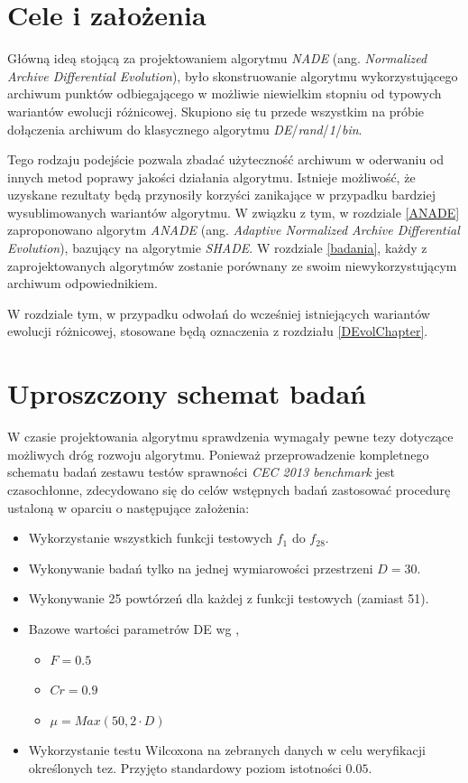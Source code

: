 \documentclass[12pt,a4paper]{report}
\begin{document}
{{{{{{\section{Cele i założenia}
\par{
Główną ideą stojącą za projektowaniem algorytmu \emph{NADE} (ang. \emph{Normalized Archive Differential Evolution}), było skonstruowanie algorytmu wykorzystującego archiwum punktów odbiegającego w możliwie niewielkim stopniu od typowych wariantów ewolucji różnicowej. Skupiono się tu przede wszystkim na próbie dołączenia archiwum do klasycznego algorytmu \emph{DE}/\emph{rand}/\emph{1}/\emph{bin}.
}
\par{
Tego rodzaju podejście pozwala zbadać użyteczność archiwum w oderwaniu od innych metod poprawy jakości działania algorytmu. Istnieje możliwość, że uzyskane rezultaty będą przynosiły korzyści zanikające w przypadku bardziej wysublimowanych wariantów algorytmu. W związku z tym, w rozdziale \ref{ANADE} zaproponowano algorytm \emph{ANADE} (ang. \emph{Adaptive Normalized Archive Differential Evolution}), bazujący na algorytmie \emph{SHADE}. W rozdziale \ref{badania}, każdy z zaprojektowanych algorytmów zostanie porównany ze swoim niewykorzystującym archiwum odpowiednikiem.
}
\par{
W rozdziale tym, w przypadku odwołań do wcześniej istniejących wariantów ewolucji różnicowej, stosowane będą oznaczenia z rozdziału \ref{DEvolChapter}.
}
\section{Uproszczony schemat badań}
\label{StandardParamsSimple}
\par{
W czasie projektowania algorytmu sprawdzenia wymagały pewne tezy dotyczące możliwych dróg rozwoju algorytmu. Ponieważ przeprowadzenie kompletnego schematu badań zestawu testów sprawności \emph{CEC 2013 benchmark} jest czasochłonne, zdecydowano się do celów wstępnych badań zastosować procedurę ustaloną w oparciu o następujące założenia:
\begin{itemize}
\item Wykorzystanie wszystkich funkcji testowych $f_1$ do $f_{28}$.
\item Wykonywanie badań tylko na jednej wymiarowości przestrzeni $D = 30$.
\item Wykonywanie 25 powtórzeń dla każdej z funkcji testowych (zamiast 51).
\item Bazowe wartości parametrów DE wg \cite{CEC2013DEbasic},
\begin{itemize}
\item $F = 0.5$
\item $Cr = 0.9$
\item $\mu = Max(50, 2 \cdot D)$
\end{itemize}
\item Wykorzystanie testu Wilcoxona na zebranych danych w celu weryfikacji określonych tez. Przyjęto standardowy poziom istotności $0.05$.
\end{itemize}
}

}}}}}}
\end{document}
